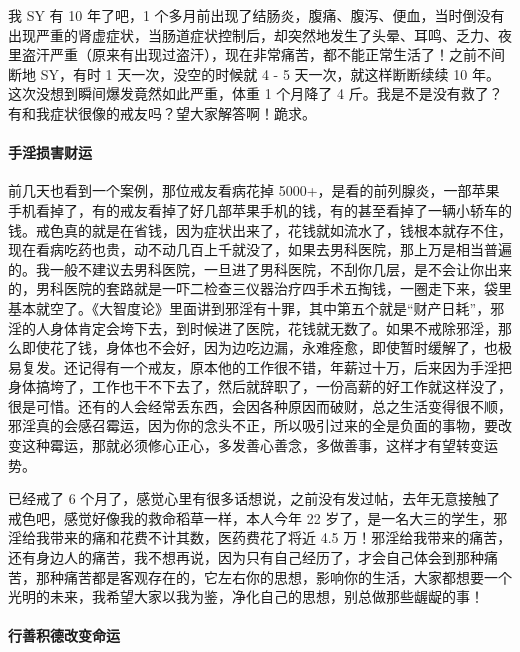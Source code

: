 \begin{case}[手淫损害健康运]
    我 SY 有 10 年了吧，1 个多月前出现了结肠炎，腹痛、腹泻、便血，当时倒没有出现严重的肾虚症状，当肠道症状控制后，却突然地发生了头晕、耳鸣、乏力、夜里盗汗严重（原来有出现过盗汗），现在非常痛苦，都不能正常生活了！之前不间断地 SY，有时 1 天一次，没空的时候就 4 - 5 天一次，就这样断断续续 10 年。这次没想到瞬间爆发竟然如此严重，体重 1 个月降了 4 斤。我是不是没有救了？有和我症状很像的戒友吗？望大家解答啊！跪求。
\end{case}

\paragraph{手淫损害财运}

前几天也看到一个案例，那位戒友看病花掉 5000+，是看的前列腺炎，一部苹果手机看掉了，有的戒友看掉了好几部苹果手机的钱，有的甚至看掉了一辆小轿车的钱。戒色真的就是在省钱，因为症状出来了，花钱就如流水了，钱根本就存不住，现在看病吃药也贵，动不动几百上千就没了，如果去男科医院，那上万是相当普遍的。我一般不建议去男科医院，一旦进了男科医院，不刮你几层，是不会让你出来的，男科医院的套路就是一吓二检查三仪器治疗四手术五掏钱，一圈走下来，袋里基本就空了。《大智度论》里面讲到邪淫有十罪，其中第五个就是“财产日耗”，邪淫的人身体肯定会垮下去，到时候进了医院，花钱就无数了。如果不戒除邪淫，那么即使花了钱，身体也不会好，因为边吃边漏，永难痊愈，即使暂时缓解了，也极易复发。还记得有一个戒友，原本他的工作很不错，年薪过十万，后来因为手淫把身体搞垮了，工作也干不下去了，然后就辞职了，一份高薪的好工作就这样没了，很是可惜。还有的人会经常丢东西，会因各种原因而破财，总之生活变得很不顺，邪淫真的会感召霉运，因为你的念头不正，所以吸引过来的全是负面的事物，要改变这种霉运，那就必须修心正心，多发善心善念，多做善事，这样才有望转变运势。

\begin{case}[手淫损害财运]
    已经戒了 6 个月了，感觉心里有很多话想说，之前没有发过帖，去年无意接触了戒色吧，感觉好像我的救命稻草一样，本人今年 22 岁了，是一名大三的学生，邪淫给我带来的痛和花费不计其数，医药费花了将近 4.5 万！邪淫给我带来的痛苦，还有身边人的痛苦，我不想再说，因为只有自己经历了，才会自己体会到那种痛苦，那种痛苦都是客观存在的，它左右你的思想，影响你的生活，大家都想要一个光明的未来，我希望大家以我为鉴，净化自己的思想，别总做那些龌龊的事！
\end{case}

\paragraph{行善积德改变命运}

